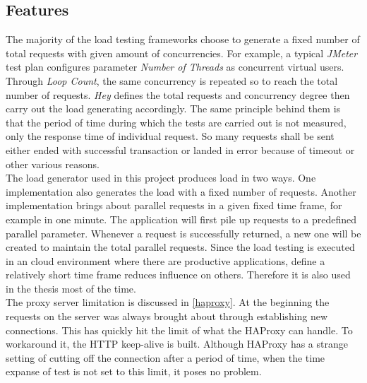 \subsection{Features}
\label{load generator}
The majority of the load testing frameworks choose to generate a fixed number of total requests with given amount of concurrencies.  For example, a typical \textit{JMeter} test plan configures parameter \textit{Number of Threads} as concurrent virtual users. Through \textit{Loop Count}, the same concurrency is repeated so to reach the total number of requests. \textit{Hey} defines the total requests and concurrency degree then carry out the load generating accordingly. The same principle behind them is that the period of time during which the tests are carried out is not measured, only the response time of individual request. So many requests shall be sent either ended with successful transaction or landed in error because of timeout or other various reasons. \\
The load generator used in this project produces load in two ways. One implementation also generates the load with a fixed number of requests. Another implementation brings about parallel requests in a given fixed time frame, for example in one minute. The application will first pile up requests to a predefined parallel parameter. Whenever a request is successfully returned, a new one will be created to maintain the total parallel requests. Since the load testing is executed in an cloud environment where there are productive applications, define a relatively short time frame reduces influence on others. Therefore it is also used in the thesis most of the time. \\

The proxy server limitation is discussed in \ref{haproxy}. At the beginning the requests on the server was always brought about through establishing new connections. This has quickly hit the limit of what the HAProxy can handle. To workaround it, the HTTP keep-alive is built. Although HAProxy has a strange setting of cutting off the connection after a period of time, when the time expanse of test is not set to this limit, it poses no problem. 

